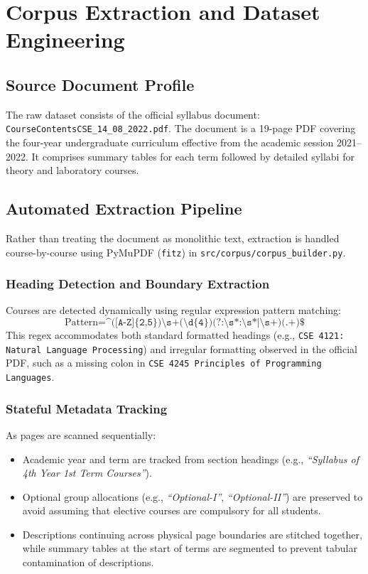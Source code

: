 \documentclass[12pt,a4paper]{report}
\begin{document}
\chapter{Corpus Extraction and Dataset Engineering}

\section{Source Document Profile}
The raw dataset consists of the official syllabus document: \texttt{CourseContentsCSE\_14\_08\_2022.pdf}. The document is a 19-page PDF covering the four-year undergraduate curriculum effective from the academic session 2021--2022. It comprises summary tables for each term followed by detailed syllabi for theory and laboratory courses.

\section{Automated Extraction Pipeline}
Rather than treating the document as monolithic text, extraction is handled course-by-course using PyMuPDF (\texttt{fitz}) in \texttt{src/corpus/corpus\_builder.py}.

\subsection{Heading Detection and Boundary Extraction}
Courses are detected dynamically using regular expression pattern matching:
\begin{equation}
    \text{Pattern} = \texttt{\textasciicircum([A-Z]\{2,5\})\textbackslash s+(\textbackslash d\{4\})(?:\textbackslash s*:\textbackslash s*|\textbackslash s+)(.+)\$}
\end{equation}
This regex accommodates both standard formatted headings (e.g., \texttt{CSE 4121: Natural Language Processing}) and irregular formatting observed in the official PDF, such as a missing colon in \texttt{CSE 4245 Principles of Programming Languages}.

\subsection{Stateful Metadata Tracking}
As pages are scanned sequentially:
\begin{itemize}
    \item Academic year and term are tracked from section headings (e.g., \textit{``Syllabus of 4th Year 1st Term Courses''}).
    \item Optional group allocations (e.g., \textit{``Optional-I''}, \textit{``Optional-II''}) are preserved to avoid assuming that elective courses are compulsory for all students.
    \item Descriptions continuing across physical page boundaries are stitched together, while summary tables at the start of terms are segmented to prevent tabular contamination of descriptions.
\end{itemize}
\end{document}
